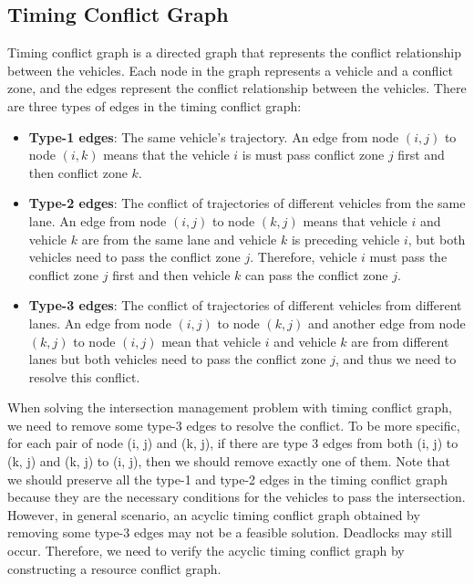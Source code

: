 \documentclass{article}
\begin{document}
\begin{multicols*}{2}
    \subsection{Timing Conflict Graph}
    Timing conflict graph is a directed graph that represents the conflict relationship between the vehicles. Each node in the graph represents a vehicle and a conflict zone, and the edges represent the conflict relationship between the vehicles. There are three types of edges in the timing conflict graph:
    \begin{itemize}[itemsep=0pt, leftmargin=*]
        \item \textbf{Type-1 edges}: The same vehicle's trajectory. An edge from node $(i,j)$ to node $(i,k)$ means that the vehicle $i$ is must pass conflict zone $j$ first and then conflict zone $k$.
        \item \textbf{Type-2 edges}: The conflict of trajectories of different vehicles from the same lane. An edge from node $(i,j)$ to node $(k,j)$ means that vehicle $i$ and vehicle $k$ are from the same lane and vehicle $k$ is preceding vehicle $i$, but both vehicles need to pass the conflict zone $j$. Therefore, vehicle $i$ must pass the conflict zone $j$ first and then vehicle $k$ can pass the conflict zone $j$.
        \item \textbf{Type-3 edges}: The conflict of trajectories of different vehicles from different lanes. An edge from node $(i,j)$ to node $(k,j)$ and another edge from node $(k,j)$ to node $(i,j)$ mean that vehicle $i$ and vehicle $k$ are from different lanes but both vehicles need to pass the conflict zone $j$, and thus we need to resolve this conflict.
    \end{itemize}
    
    When solving the intersection management problem with timing conflict graph, we need to remove some type-3 edges to resolve the conflict. To be more specific, for each pair of node (i, j) and (k, j), if there are type 3 edges from both (i, j) to (k, j) and  (k, j) to (i, j), then we should remove exactly one of them. Note that we should preserve all the type-1 and type-2 edges in the timing conflict graph because they are the necessary conditions for the vehicles to pass the intersection. However, in general scenario, an acyclic timing conflict graph obtained by removing some type-3 edges may not be a feasible solution. Deadlocks may still occur. Therefore, we need to verify the acyclic timing conflict graph by constructing a resource conflict graph.
    

\end{multicols*}
\end{document}
